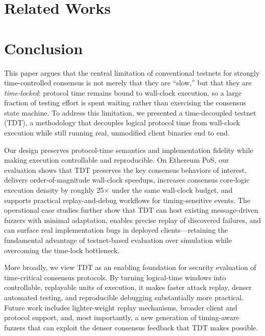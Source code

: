 \section{Related Works}

\section{Conclusion}\label{sec:conclusion}

This paper argues that the central limitation of conventional testnets for strongly time-controlled consensus is not merely that they are ``slow,'' but that they are \emph{time-locked}: protocol time remains bound to wall-clock execution, so a large fraction of testing effort is spent waiting rather than exercising the consensus state machine. To address this limitation, we presented a time-decoupled testnet (TDT), a methodology that decouples logical protocol time from wall-clock execution while still running real, unmodified client binaries end to end.

Our design preserves protocol-time semantics and implementation fidelity while making execution controllable and reproducible. On Ethereum PoS, our evaluation shows that TDT preserves the key consensus behaviors of interest, delivers order-of-magnitude wall-clock speedups, increases consensus core-logic execution density by roughly 25$\times$ under the same wall-clock budget, and supports practical replay-and-debug workflows for timing-sensitive events. The operational case studies further show that TDT can host existing message-driven fuzzers with minimal adaptation, enables precise replay of discovered failures, and can surface real implementation bugs in deployed clients---retaining the fundamental advantage of testnet-based evaluation over simulation while overcoming the time-lock bottleneck.

More broadly, we view TDT as an enabling foundation for security evaluation of time-critical consensus protocols. By turning logical-time windows into controllable, replayable units of execution, it makes faster attack replay, denser automated testing, and reproducible debugging substantially more practical. Future work includes lighter-weight replay mechanisms, broader client and protocol support, and, most importantly, a new generation of timing-aware fuzzers that can exploit the denser consensus feedback that TDT makes possible.


